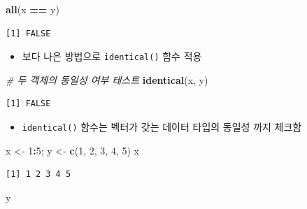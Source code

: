 \documentclass[
  11pt,
]{krantz}
\newenvironment{Shaded}{\begin{snugshade}}{\end{snugshade}}
\newcommand{\CommentTok}[1]{\textcolor[rgb]{0.37,0.37,0.37}{\textit{#1}}}
\newcommand{\DecValTok}[1]{\textcolor[rgb]{0.06,0.06,0.06}{#1}}
\newcommand{\KeywordTok}[1]{\textcolor[rgb]{0.27,0.27,0.27}{\textbf{#1}}}
\newcommand{\NormalTok}[1]{#1}
\newcommand{\OperatorTok}[1]{\textcolor[rgb]{0.43,0.43,0.43}{\textbf{#1}}}
\newcommand{\StringTok}[1]{\textcolor[rgb]{0.5,0.5,0.5}{#1}}
\providecommand{\tightlist}{%
  \setlength{\itemsep}{0pt}\setlength{\parskip}{0pt}}
\begin{document}
\begin{Shaded}
\begin{Highlighting}[]
\KeywordTok{all}\NormalTok{(x }\OperatorTok{==}\StringTok{ }\NormalTok{y)}
\end{Highlighting}
\end{Shaded}

\begin{verbatim}
[1] FALSE
\end{verbatim}

\normalsize

\begin{itemize}
\tightlist
\item
  보다 나은 방법으로 \texttt{identical()} 함수 적용
\end{itemize}

\footnotesize

\begin{Shaded}
\begin{Highlighting}[]
\CommentTok{# 두 객체의 동일성 여부 테스트}
\KeywordTok{identical}\NormalTok{(x, y)}
\end{Highlighting}
\end{Shaded}

\begin{verbatim}
[1] FALSE
\end{verbatim}

\normalsize

\begin{itemize}
\tightlist
\item
  \texttt{identical()} 함수는 벡터가 갖는 데이터 타입의 동일성 까지 체크함
\end{itemize}

\footnotesize

\begin{Shaded}
\begin{Highlighting}[]
\NormalTok{x <-}\StringTok{ }\DecValTok{1}\OperatorTok{:}\DecValTok{5}\NormalTok{; y <-}\StringTok{ }\KeywordTok{c}\NormalTok{(}\DecValTok{1}\NormalTok{, }\DecValTok{2}\NormalTok{, }\DecValTok{3}\NormalTok{, }\DecValTok{4}\NormalTok{, }\DecValTok{5}\NormalTok{)}
\NormalTok{x}
\end{Highlighting}
\end{Shaded}

\begin{verbatim}
[1] 1 2 3 4 5
\end{verbatim}

\begin{Shaded}
\begin{Highlighting}[]
\NormalTok{y}
\end{Highlighting}
\end{Shaded}
\end{document}
